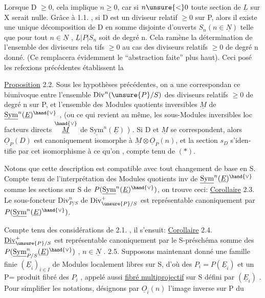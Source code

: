 
Lorsque D $\geq 0$, cela implique $n \geq 0$, car si  $n \unsure{<} 0$ toute section de
$\underline{L}$ sur X serait nulle. Grâce à 1.1. , si D est un diviseur relatif
$\geq 0$ sur P, alors il existe une unique décomposition de D en somme
disjointe d'ouverts $S_n (n \in \underline{N})$ telle que pour tout $n \in \underline{N}$ , $\underline{L}|P|S_n$ soit de
degré n. Cela ramène la détermination de l'ensemble des diviseurs rela%
tifs $\geq 0$ au cas des diviseurs relatifs $\geq 0$ de degré n donné. (Ce
\placedmargin{$/\!/$}  remplacera évidemment le ``abstraction faite'' plus haut). Ceci posé
les refexions précédentes établissent la

\uline{Proposition} 2.2. Sous les hypothèses précédentes, on a une correspondan%
ce biunivoque entre l'ensemble $\mathrm{Div}^{n}(\unsure{P}/S)$ des diviseurs relatifs $\geq 0$ de
degré n sur P, et l'ensemble des Modules quotients inversibles $\underline{M}$ de
$\underline{\mathrm{Sym}}^{n}(\underline{E})^{\hand{\vee}}$ , (ou ce qui revient au même, les sous-Modules inversibles loc
facteurs directs $\overset{\hand{\vee}}{\underline{M}}$ de $\underline{\mathrm{Sym}}^{n}(\underline{E})$ ) . Si D et $\underline{M}$ se correspondent, alors
$\underline{O}_P(D)$ est canoniquement isomorphe à $\underline{M}\otimes\underline{O}_P(n)$, et la section $s_D$ s'iden-%
tifie par cet isomorphisme à ce qu'on , compte tenu de $(*)$.

Notons que cette description est compatible avec tout changement de
base en S. Compte tenu de l'interprétation des Modules quotients inv de
$\underline{\mathrm{Sym}}^{n}(\underline{E})^{\hand{\vee}}$ comme les sections sur S de $P(\underline{\mathrm{Sym}}^{n}(\underline{E})^{\hand{\vee}})$, on trouve ceci:
\uline{Corollaire} 2.3. Le sous-foncteur  $\mathrm{Div}^{n}_{P/S}$ de $\mathrm{Div}^{+}_{\unsure{P}/S}$ est représentable
canoniquement par $P(\underline{\mathrm{Sym}}^{n}(\underline{E})^{\hand{\vee}})$.

Compte tenu des considérations de 2.1. , il s'ensuit:
\uline{Corollaire} 2.4. $\underline{\mathrm{Div}}^{+}_{\unsure{P}/S}$ est représentable canoniquement  par
le S-préschéma somme des $P(\underline{\mathrm{Sym}}^{n}_{P/S}(\underline{E})^{\hand{\vee}})$ , $n \in \underline{N}$ .
2.5. Supposons maintenant donné une famille finie $(\underline{E}_i)_{i \in I}$ de Modules
localement libres sur S, d'où des $P_i = P(\underline{E}_i)$ et un P= produit fibré des
$P_i$ , appelé aussi \uline{fibré multiprojectif} sur S défini par $(\underline{E}_i)$ . Pour
simplifier les notations, désignons par $\underline{O}_i(n)$ l'image inverse sur P du

